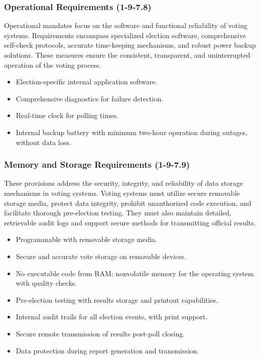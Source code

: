 \documentclass{article}
\begin{document}
\subsubsection{Operational Requirements (1-9-7.8)}
Operational mandates focus on the software and functional reliability of voting systems. Requirements encompass specialized election software, comprehensive self-check protocols, accurate time-keeping mechanisms, and robust power backup solutions. These measures ensure the consistent, transparent, and uninterrupted operation of the voting process.

\begin{itemize}
    \item Election-specific internal application software.
    \item Comprehensive diagnostics for failure detection.
    \item Real-time clock for polling times.
    \item Internal backup battery with minimum two-hour operation during outages, without data loss.
\end{itemize}

\subsubsection{Memory and Storage Requirements (1-9-7.9)}
These provisions address the security, integrity, and reliability of data storage mechanisms in voting systems. Voting systems must utilize secure removable storage media, protect data integrity, prohibit unauthorized code execution, and facilitate thorough pre-election testing. They must also maintain detailed, retrievable audit logs and support secure methods for transmitting official results.

\begin{itemize}
    \item Programmable with removable storage media.
    \item Secure and accurate vote storage on removable devices.
    \item No executable code from RAM; nonvolatile memory for the operating system with quality checks.
    \item Pre-election testing with results storage and printout capabilities.
    \item Internal audit trails for all election events, with print support.
    \item Secure remote transmission of results post-poll closing.
    \item Data protection during report generation and transmission.
\end{itemize}
\end{document}
